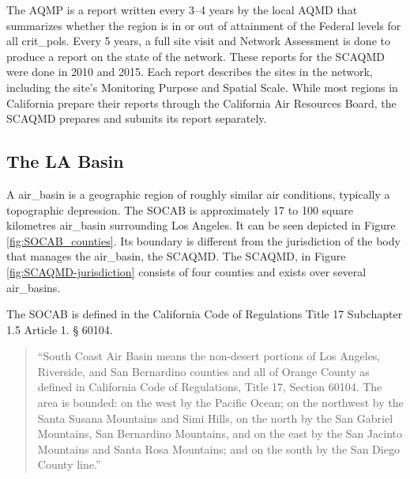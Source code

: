 \documentclass{article}
\begin{document}
	The \ac{AQMP} is a report written every 3–4 years by the local \ac{AQMD} that summarizes whether the region is in or out of attainment of the Federal levels for all \glspl{crit_pol}.
	Every 5 years, a full site visit and Network Assessment is done to produce a report on the state of the network. These reports for the \ac{SCAQMD} were done in 2010 and 2015.  Each report describes the sites in the network, including the site's Monitoring Purpose and Spatial Scale.  While most regions in California prepare their reports through the California Air Resources Board, the \ac{SCAQMD} prepares and submits its report separately.
	
	
	
	\subsection{The LA Basin} \label{subsec:labasin}
	A \gls{air_basin} is a geographic region of roughly similar air conditions, typically a topographic depression.  The \ac{SOCAB} is approximately 17 to 100 square kilometres \gls{air_basin} surrounding Los Angeles.  It can be seen depicted in Figure \ref{fig:SOCAB_counties}.  Its boundary is different from the jurisdiction of the body that manages the \gls{air_basin}, the \ac{SCAQMD}. The \ac{SCAQMD}, in Figure \ref{fig:SCAQMD-jurisdiction} consists of four counties and exists over several \glspl{air_basin}.  
	
	
	The \ac{SOCAB} is defined in the California Code of Regulations Title 17  Subchapter 1.5  Article 1.  § 60104.   
	\begin{quote}
		``South Coast Air Basin means the non-desert portions of Los Angeles, Riverside, and San Bernardino counties and all of Orange County as defined in California Code of Regulations, Title 17, Section 60104. The area is bounded: on the west by the Pacific Ocean; on the northwest by the Santa Susana Mountains and Simi Hills, on the north by the San Gabriel Mountains, San Bernardino Mountains, and on the east by the San Jacinto Mountains and Santa Rosa Mountains; and on the south by the San Diego County line.''
		
	\end{quote}
	
\end{document}

